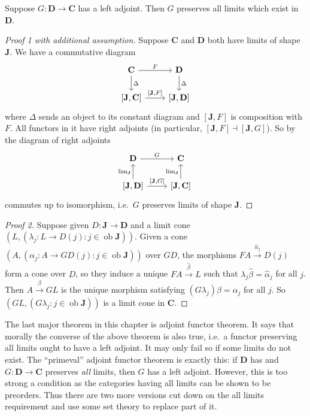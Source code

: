 \documentclass[a4paper]{article}
\renewcommand{\c}[1]{\mathbf{#1}}
\DeclareMathOperator{\ob}{ob}
\newcommand{\adjoint}{\dashv}
\begin{document}
\begin{theorem}
  Suppose \(G: \c D \to \c C\) has a left adjoint. Then \(G\) preserves all limits which exist in \(\c D\).
\end{theorem}

\begin{proof}[Proof 1 with additional assumption]
  Suppose \(\c C\) and \(\c D\) both have limits of shape \(\c J\). We have a commutative diagram
  \[
    \begin{tikzcd}
      \c C \ar[r, "F"] \ar[d, "\Delta"] & \c D \ar[d, "\Delta"] \\
      {[\c J, \c C]} \ar[r, "{[\c J, F]}"] & {[\c J, \c D]}
    \end{tikzcd}
  \]
  where \(\Delta\) sends an object to its constant diagram and \([\c J, F]\) is composition with \(F\). All functors in it have right adjoints (in particular, \([\c J, F] \adjoint [\c J, G]\)). So by  the diagram of right adjoints
  \[
    \begin{tikzcd}
      \c D \ar[r, "G"] & \c C \\
      {[\c J, \c D]} \ar[u, "\lim_{\c J}"] \ar[r, "{[\c J, G]}"] & {[\c J, \c C]} \ar[u, "\lim_{\c J}"]
    \end{tikzcd}
  \]
  commutes up to isomorphism, i.e.\ \(G\) preserves limits of shape \(\c J\).
\end{proof}

\begin{proof}[Proof 2]
  Suppose given \(D: \c J \to \c D\) and a limit cone \((L, (\lambda_j: L \to D(j): j \in \ob \c J))\). Given a cone \((A, (\alpha_j: A \to GD(j):j \in \ob \c J))\) over \(GD\), the morphisms \(FA \xrightarrow{\hat \alpha_j} D(j)\) form a cone over \(D\), so they induce a unique \(FA \xrightarrow{\hat \beta} L\) such that \(\lambda_j \hat \beta = \hat \alpha_j\) for all \(j\). Then \(A \xrightarrow{\beta} GL\) is the unique morphism satisfying \((G\lambda_j)\beta = \alpha_j\) for all \(j\). So \((GL, (G\lambda_j: j \in \ob \c J))\) is a limit cone in \(\c C\).
\end{proof}

The last major theorem in this chapter is adjoint functor theorem. It says that morally the converse of the above theorem is also true, i.e.\ a functor preserving all limits ought to have a left adjoint. It may only fail so if some limits do not exist. The ``primeval'' adjoint functor theorem is exactly this: if \(\c D\) has and \(G: \c D \to \c C\) preserves \emph{all} limits, then \(G\) has a left adjoint. However, this is too strong a condition as the categories having all limits can be shown to be preorders. Thus there are two more versions cut down on the all limits requirement and use some set theory to replace part of it.
\end{document}
